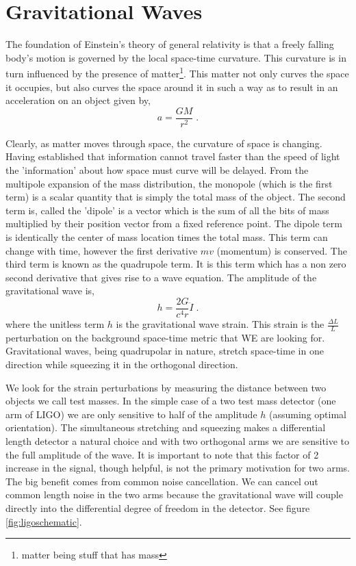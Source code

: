 \acresetall



\section{Gravitational Waves}

The foundation of Einstein's theory of general relativity is that a freely
falling body's motion is governed by the local space-time curvature.
This curvature is in turn influenced by the presence of
matter\footnote{matter being stuff that has mass}.
This matter not only curves the space it occupies, but also curves the space
around it in such a way as to result in an acceleration on an object given by,
\begin{equation}
a = \frac{GM}{r^2} \;.
\end{equation}

Clearly, as matter moves through space, the curvature of space is changing.
Having established that information cannot travel faster than the speed of light
the 'information' about how space must curve will be delayed.
From the multipole expansion of the mass distribution, the monopole (which is
the first term) is a scalar quantity that is simply the total
mass of the object.
The second term is, called the 'dipole' is a vector which is the sum of all the
bits of mass multiplied by their position vector from a fixed reference point.
The dipole term is identically the center of mass location times the total mass.
This term can change with time, however the first derivative $mv$ (momentum)
is conserved.
The third term is known as the quadrupole term.
It is this term which has a non zero second derivative that gives rise to a
wave equation.
The amplitude of the gravitational wave is,
\begin{equation}
h = \frac{2G}{c^4r}\ddot I \;.
\end{equation}
where the unitless term $h$ is the gravitational wave strain.
This strain is the $\frac{\Delta L}{L}$ perturbation on the background
space-time metric that WE are looking for.
Gravitational waves, being quadrupolar in nature, stretch space-time in one
direction while squeezing it in the orthogonal direction.


We look for the strain perturbations by measuring the distance between two
objects we call test masses.
In the simple case of a two test mass detector (one arm of LIGO) we are only
sensitive to half of the amplitude $h$ (assuming optimal orientation).
The simultaneous stretching and squeezing makes a differential length detector
a natural choice and with two orthogonal arms we are sensitive to the full
amplitude of the wave.
It is important to note that this factor of 2 increase in the signal, though
helpful, is not the primary motivation for two arms. 
The big benefit comes from common noise cancellation.
We can cancel out common length noise in the two arms because the gravitational
wave will couple directly into the differential degree of freedom in the
detector. See figure \ref{fig:ligoschematic}.

